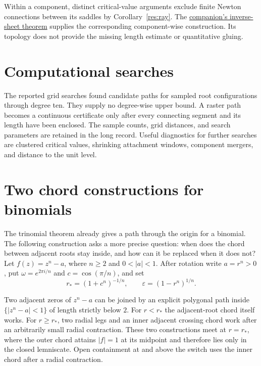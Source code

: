 \documentclass[11pt]{article}
\begin{document}
Within a component, distinct critical-value arguments exclude finite
Newton connections between its saddles by Corollary~\ref{res:ray}.
The \href{erdos1041-lemniscate-reasoning-surface.pdf\#inverse-sheet-component}{companion's inverse-sheet theorem}
supplies the corresponding component-wise construction. Its topology does
not provide the missing length estimate or quantitative gluing.

\section{Computational searches}\label{sec:finite}

The reported grid searches found candidate paths for sampled root
configurations through degree ten.  They supply no degree-wise upper bound.  A raster path
becomes a continuous certificate only after every connecting segment and its
length have been enclosed.  The sample counts, grid distances, and search
parameters are retained in the long record.  Useful diagnostics for further searches are clustered critical values, shrinking attachment windows,
component mergers, and distance to the unit level.

\section{Two chord constructions for binomials}
\label{sec:binomial}


The trinomial theorem already gives a path through the origin for a
binomial. The following construction asks a more precise question: when
does the chord between adjacent roots stay inside, and how can it be
replaced when it does not?  Let
$f(z)=z^n-a$, where $n\ge2$ and $0<|a|<1$.  After rotation write $a=r^n>0$,
put $\omega=e^{2\pi i/n}$ and $c=\cos(\pi/n)$, and set
\[
 r_*=(1+c^n)^{-1/n},\qquad
 \varepsilon=(1-r^n)^{1/n}.
\]

\begin{theorem}
Two adjacent zeros of $z^n-a$ can be joined by an explicit polygonal path
inside $\{|z^n-a|<1\}$ of length strictly below $2$.  For $r<r_*$ the
adjacent-root chord itself works.  For $r\ge r_*$, two radial legs and an
inner adjacent crossing chord work after an arbitrarily small radial
contraction.  These two constructions meet at $r=r_*$, where the outer chord attains
$|f|=1$ at its midpoint and therefore lies only in the closed lemniscate.
Open containment at and above the switch uses the inner chord
after a radial contraction.
\end{theorem}
\end{document}
